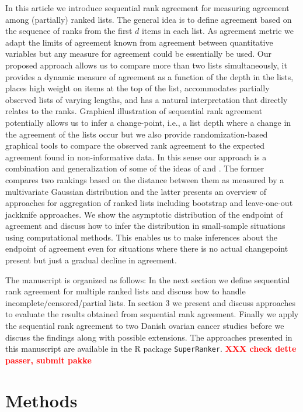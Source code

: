 \documentclass[12pt,a4paper]{article}
\newcommand{\mcomment}[1]{\textcolor{red}{\textbf{#1}}}
\theoremstyle{plain}
\begin{document}
In this article we introduce sequential rank agreement for measuring
agreement among (partially) ranked lists.  The general idea is to
define agreement based on the sequence of ranks from the first $d$
items in each list. As agreement metric we adapt the limits of
agreement known from agreement between quantitative variables
\citep{alt:bland:1983,Carstensen2010} but any measure for agreement
could be essentially be used. Our proposed approach allows us to
compare more than two lists simultaneously, it provides a dynamic
measure of agreement as a function of the depth in the lists, places
high weight on items at the top of the list, accommodates partially
observed lists of varying lengths, and has a natural interpretation
that directly relates to the ranks.  Graphical illustration of
sequential rank agreement potentially allows us to infer a
change-point, i.e., a list depth where a change in the agreement of
the lists occur but we also provide randomization-based graphical
tools to compare the observed rank agreement to the expected agreement
found in non-informative data.  In this sense our approach is a
combination and generalization of some of the ideas of
\citet{Carterette2009} and \citet{Boulesteix2009}. The former compares
two rankings based on the distance between them as measured by a
multivariate Gaussian distribution and the latter presents an overview
of approaches for aggregation of ranked lists including bootstrap and
leave-one-out jackknife approaches. We show the asymptotic
distribution of the endpoint of agreement and discuss how to infer the
distribution in small-sample situations using computational
methods. This enables us to make inferences about the endpoint of
agreement even for situations where there is no actual changepoint
present but just a gradual decline in agreement.

The manuscript is organized as follows: In the next section we define
sequential rank agreement for multiple ranked lists and discuss how to
handle incomplete/censored/partial lists. In section 3 we present and
discuss approaches to evaluate the results obtained from sequential
rank agreement. Finally we apply the sequential rank agreement to two
Danish ovarian cancer studies before we discuss the findings along
with possible extensions. The approaches presented in this manuscript
are available in the R package \texttt{SuperRanker}. \mcomment{XXX check dette
passer, submit pakke}



\section{Methods}
\end{document}
